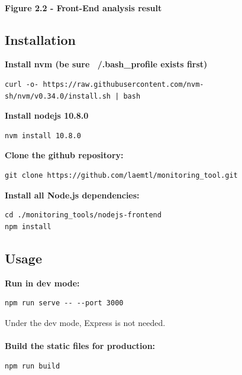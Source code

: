 \documentclass[12pt,hidelinks]{article}
\begin{document}
\begin{center}
	 \\
	\textbf{Figure 2.2 - Front-End analysis result}
\end{center}


\subsection{Installation} 
\textbf{Install nvm (be sure ~/.bash\_profile exists first)}
\begin{verbatim}
curl -o- https://raw.githubusercontent.com/nvm-sh/nvm/v0.34.0/install.sh | bash
\end{verbatim}

\textbf{Install nodejs 10.8.0}
\begin{verbatim}
nvm install 10.8.0
\end{verbatim}

\textbf{Clone the github repository:}
\begin{verbatim}
git clone https://github.com/laemtl/monitoring_tool.git
\end{verbatim}

\textbf{Install all Node.js dependencies:}
\begin{verbatim}
cd ./monitoring_tools/nodejs-frontend
npm install
\end{verbatim}

\subsection{Usage}
\textbf{Run in dev mode:}
\begin{verbatim}
npm run serve -- --port 3000
\end{verbatim}
Under the dev mode, Express is not needed. \\
\\
\textbf{Build the static files for production:}
\begin{verbatim}
npm run build
\end{verbatim}
\end{document}
